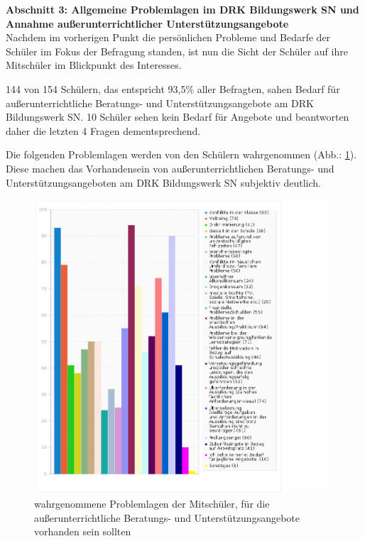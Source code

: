 \noindent
\textbf{Abschnitt 3: Allgemeine Problemlagen im DRK Bildungswerk SN und Annahme außerunterrichtlicher Unterstützungsangebote}\\

\noindent
Nachdem im vorherigen Punkt die persönlichen Probleme und Bedarfe der Schüler im Fokus der Befragung standen, ist nun die Sicht der Schüler auf ihre Mitschüler im Blickpunkt des Interesses.

144 von 154 Schülern, das entspricht 93,5\% aller Befragten, sahen Bedarf für außerunterrichtliche Beratungs- und Unterstützungsangebote am DRK Bildungswerk SN. 10 Schüler sehen kein Bedarf für Angebote und beantworten daher die letzten 4 Fragen dementsprechend.

Die folgenden Problemlagen werden von den Schülern wahrgenommen (Abb.: \ref{fig:Problemlagen-der-Mitschueler}). Diese machen das Vorhandensein von außerunterrichtlichen Beratungs- und Unterstützungsangeboten am DRK Bildungswerk SN subjektiv deutlich.

\begin{figure}[hp]
	\centering
		\includegraphics[width=1.0\textwidth]{images/Problemlagen-der-Mitschueler.png}
	\caption{wahrgenommene Problemlagen der Mitschüler, für die außerunterrichtliche Beratungs- und Unterstützungsangebote vorhanden sein sollten}
	\label{fig:Problemlagen-der-Mitschueler}
\end{figure}

